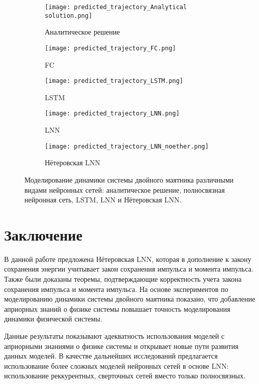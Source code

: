 \documentclass[12pt]{article}
\begin{document}
\begin{figure}[H]
	\centering
	\begin{subfigure}[b]{0.49\textwidth}
		\centering
		\texttt{[image: predicted\_trajectory\_Analytical solution.png]}
		\caption{Аналитическое решение}
		\label{fig:y equals x}
	\end{subfigure}
	\hfill
	\begin{subfigure}[b]{0.49\textwidth}
		\centering
		\texttt{[image: predicted\_trajectory\_FC.png]}
		\caption{FC}
		\label{fig:three sin x}
	\end{subfigure}
	\hfill
	\vfill
	\begin{subfigure}[b]{0.49\textwidth}
		\centering
		\texttt{[image: predicted\_trajectory\_LSTM.png]}
		\caption{LSTM}
		\label{fig:three sin x}
	\end{subfigure}
	\hfill
	\begin{subfigure}[b]{0.49\textwidth}
		\centering
		\texttt{[image: predicted\_trajectory\_LNN.png]}
		\caption{LNN}
		\label{fig:five over x}
	\end{subfigure}
	\begin{subfigure}[b]{0.49\textwidth}
		\centering
		\texttt{[image: predicted\_trajectory\_LNN\_noether.png]}
		\caption{Нётеровская LNN}
		\label{fig:five over x}
	\end{subfigure}
	\caption{Моделирование динамики системы двойного маятника различными видами нейронных сетей: аналитическое решение, полносвязная нейронная сеть, LSTM, LNN и Нётеровская LNN.}
	\label{fig:result_graphs}
\end{figure}


\section{Заключение}
	В данной работе предложена Нётеровская LNN, которая в дополнение к закону сохранения энергии учитывает закон сохранения импульса и момента импульса. Также были доказаны теоремы, подтверждающие корректность учета закона сохранения импульса и момента импульса. На основе экспериментов по моделированию динамики системы двойного маятника показано, что добавление априорных знаний о физике системы повышает точность моделирования динамики физической системы. 
	
	Данные результаты показывают адекватность использования моделей с априорными знаниями о физике системы и открывает новые пути развития данных моделей. В качестве дальнейших исследований предлагается использование более сложных моделей нейронных сетей в основе LNN: использование реккурентных, сверточных сетей вместо только полносвязных.

\newpage

\newpage



\end{document}

